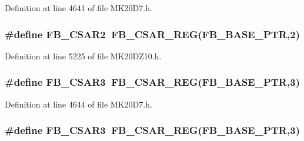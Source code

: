 Definition at line 4641 of file M\+K20\+D7.\+h.

\subsubsection[{\texorpdfstring{F\+B\+\_\+\+C\+S\+A\+R2}{FB_CSAR2}}]{\setlength{\rightskip}{0pt plus 5cm}\#define F\+B\+\_\+\+C\+S\+A\+R2~{\bf F\+B\+\_\+\+C\+S\+A\+R\+\_\+\+R\+EG}({\bf F\+B\+\_\+\+B\+A\+S\+E\+\_\+\+P\+TR},2)}\hypertarget{group___f_b___register___accessor___macros_ga8d6a95439b3eb0674253cb08a44a6a52}{}\label{group___f_b___register___accessor___macros_ga8d6a95439b3eb0674253cb08a44a6a52}


Definition at line 5225 of file M\+K20\+D\+Z10.\+h.

\subsubsection[{\texorpdfstring{F\+B\+\_\+\+C\+S\+A\+R3}{FB_CSAR3}}]{\setlength{\rightskip}{0pt plus 5cm}\#define F\+B\+\_\+\+C\+S\+A\+R3~{\bf F\+B\+\_\+\+C\+S\+A\+R\+\_\+\+R\+EG}({\bf F\+B\+\_\+\+B\+A\+S\+E\+\_\+\+P\+TR},3)}\hypertarget{group___f_b___register___accessor___macros_gaeb2eeb947ae48a18e68351757decde18}{}\label{group___f_b___register___accessor___macros_gaeb2eeb947ae48a18e68351757decde18}


Definition at line 4644 of file M\+K20\+D7.\+h.

\subsubsection[{\texorpdfstring{F\+B\+\_\+\+C\+S\+A\+R3}{FB_CSAR3}}]{\setlength{\rightskip}{0pt plus 5cm}\#define F\+B\+\_\+\+C\+S\+A\+R3~{\bf F\+B\+\_\+\+C\+S\+A\+R\+\_\+\+R\+EG}({\bf F\+B\+\_\+\+B\+A\+S\+E\+\_\+\+P\+TR},3)}\hypertarget{group___f_b___register___accessor___macros_gaeb2eeb947ae48a18e68351757decde18}{}\label{group___f_b___register___accessor___macros_gaeb2eeb947ae48a18e68351757decde18}


